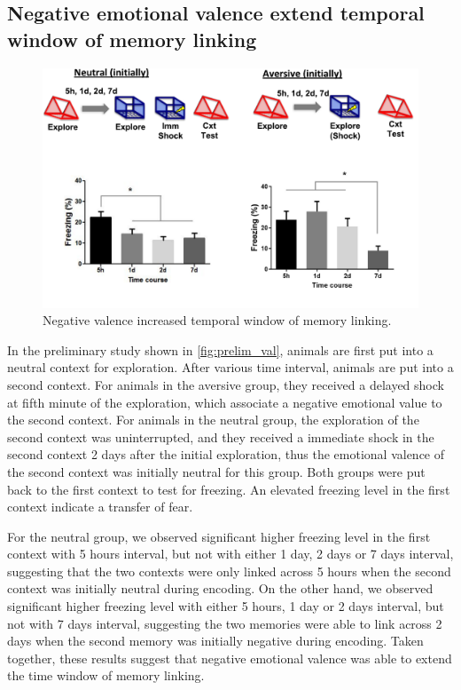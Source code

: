 \documentclass[master.tex]{subfiles}
\begin{document}
\subsection*{Negative emotional valence extend temporal window of memory
  linking}

\begin{figure}
  \centering \includegraphics[scale = .4]{Figures/val_retro_prelim.pdf}
  \caption{\footnotesize Negative valence increased temporal window of memory
    linking.}
  \label{fig:prelim_val}
\end{figure}

In the preliminary study shown in \autoref{fig:prelim_val}, animals are first
put into a neutral context for exploration. After various time interval, animals
are put into a second context. For animals in the aversive group, they received
a delayed shock at fifth minute of the exploration, which associate a negative
emotional value to the second context. For animals in the neutral group, the
exploration of the second context was uninterrupted, and they received a
immediate shock in the second context 2 days after the initial exploration, thus
the emotional valence of the second context was initially neutral for this
group. Both groups were put back to the first context to test for freezing. An
elevated freezing level in the first context indicate a transfer of fear.

For the neutral group, we observed significant higher freezing level in the
first context with 5 hours interval, but not with either 1 day, 2 days or 7 days
interval, suggesting that the two contexts were only linked across 5 hours when
the second context was initially neutral during encoding. On the other hand, we
observed significant higher freezing level with either 5 hours, 1 day or 2 days
interval, but not with 7 days interval, suggesting the two memories were able to
link across 2 days when the second memory was initially negative during
encoding. Taken together, these results suggest that negative emotional valence
was able to extend the time window of memory linking.
\end{document}
